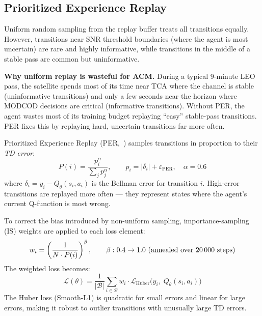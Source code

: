 \documentclass[12pt,a4paper]{report}
\begin{document}
\subsection{Prioritized Experience Replay}
\label{sec:per}

Uniform random sampling from the replay buffer treats all transitions equally.
However, transitions near SNR threshold boundaries (where the agent is most
uncertain) are rare and highly informative, while transitions in the middle
of a stable pass are common but uninformative.

\begin{keyinsight}
\textbf{Why uniform replay is wasteful for ACM.}  During a typical 9-minute
LEO pass, the satellite spends most of its time near TCA where the channel is
stable (uninformative transitions) and only a few seconds near the horizon where
MODCOD decisions are critical (informative transitions).  Without PER, the agent
wastes most of its training budget replaying ``easy'' stable-pass transitions.
PER fixes this by replaying hard, uncertain transitions far more often.
\end{keyinsight}

Prioritized Experience Replay (PER,~\cite{schaul2016per}) samples transitions in
proportion to their \emph{TD error}:
\begin{equation}
    P(i) = \frac{p_i^\alpha}{\sum_j p_j^\alpha}, \qquad
    p_i = \bigl|\delta_i\bigr| + \varepsilon_\text{PER},\quad \alpha = 0.6
\end{equation}
where $\delta_i = y_i - Q_\theta(s_i, a_i)$ is the Bellman error for
transition $i$. High-error transitions are replayed more often --- they
represent states where the agent's current Q-function is most wrong.

To correct the bias introduced by non-uniform sampling, importance-sampling
(IS) weights are applied to each loss element:
\begin{equation}
    w_i = \left(\frac{1}{N \cdot P(i)}\right)^\beta,
    \qquad \beta: 0.4 \to 1.0 \text{ (annealed over 20\,000 steps)}
\end{equation}
The weighted loss becomes:
\begin{equation}
    \mathcal{L}(\theta) = \frac{1}{|\mathcal{B}|}\sum_{i \in \mathcal{B}}
    w_i \cdot \mathcal{L}_\text{Huber}\!\bigl(y_i,\; Q_\theta(s_i, a_i)\bigr)
\end{equation}
The Huber loss (Smooth-L1) is quadratic for small errors and linear for
large errors, making it robust to outlier transitions with unusually large
TD errors.
\end{document}
